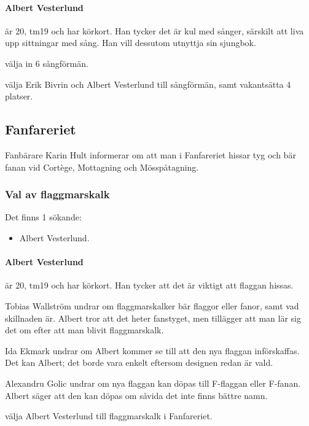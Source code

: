 \documentclass[hidelinks]{sektionsmote}
\begin{document}
\paragraph{Albert Vesterlund} är 20, tm19 och har körkort.
Han tycker det är kul med sånger, särskilt att liva upp sittningar med sång.
Han vill dessutom utnyttja sin sjungbok.

\begin{beslut}
  \item välja in 6 sångförmän.
  \item välja Erik Bivrin och Albert Vesterlund till sångförmän, samt vakantsätta 4 platser.
\end{beslut}


\subsection{Fanfareriet}
Fanbärare Karin Hult informerar om att man i Fanfareriet hissar tyg och bär fanan vid Cortège, Mottagning och Mösspåtagning.

\subsubsection{Val av flaggmarskalk}
Det finns 1 sökande:
\begin{itemize}
    \item Albert Vesterlund.
\end{itemize}

\paragraph{Albert Vesterlund} är 20, tm19 och har körkort.
Han tycker att det är viktigt att flaggan hissas.

Tobias Wallström undrar om flaggmarskalker bär flaggor eller fanor, samt vad skillnaden är.
Albert tror att det heter fanstyget, men tillägger att man lär sig det om efter att man blivit flaggmarskalk.

Ida Ekmark undrar om Albert kommer se till att den nya flaggan införskaffas.
Det kan Albert; det borde vara enkelt eftersom designen redan är vald.

Alexandru Golic undrar om nya flaggan kan döpas till F-flaggan eller F-fanan.
Albert säger att den kan döpas om såvida det inte finns bättre namn.

\begin{beslut}
  \item välja Albert Vesterlund till flaggmarskalk i Fanfareriet.
\end{beslut}
\end{document}
